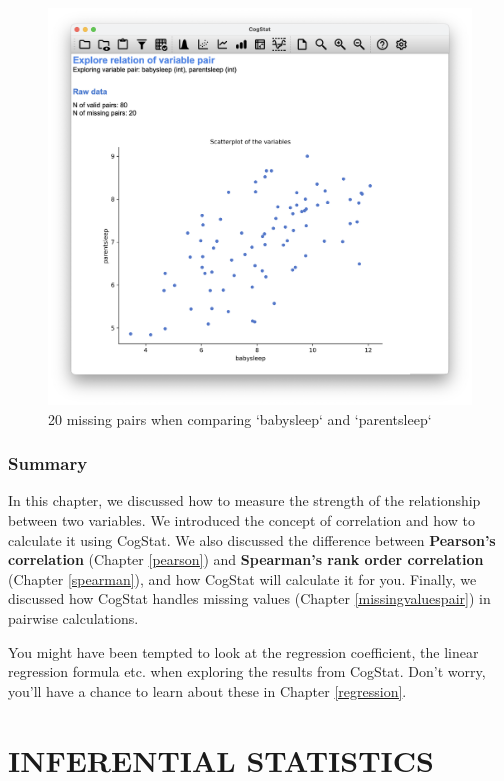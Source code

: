 \documentclass[
]{book}
\theoremstyle{definition}
\theoremstyle{definition}
\theoremstyle{definition}
\theoremstyle{definition}
\theoremstyle{remark}
\begin{document}
\begin{figure}

{\centering \includegraphics[width=0.66\linewidth]{resources/image/cogstatparentsleepbabysleepmissing} 

}

\caption{20 missing pairs when comparing `babysleep` and `parentsleep`}\label{fig:parenthoodmissingcog3}
\end{figure}

\hypertarget{summary-1}{%
\section{Summary}\label{summary-1}}

In this chapter, we discussed how to measure the strength of the relationship between two variables. We introduced the concept of correlation and how to calculate it using CogStat. We also discussed the difference between \textbf{Pearson's correlation} (Chapter \ref{pearson}) and \textbf{Spearman's rank order correlation} (Chapter \ref{spearman}), and how CogStat will calculate it for you. Finally, we discussed how CogStat handles missing values (Chapter \ref{missingvaluespair}) in pairwise calculations.

You might have been tempted to look at the regression coefficient, the linear regression formula etc. when exploring the results from CogStat. Don't worry, you'll have a chance to learn about these in Chapter \ref{regression}.

\hypertarget{part-inferential-statistics}{%
\part*{INFERENTIAL STATISTICS}\label{part-inferential-statistics}}
\end{document}

